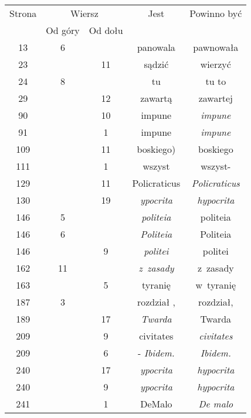\documentclass[a4paper,11pt]{article}
\numberwithin{equation}{section}
\begin{document}
\newpage



\begin{center}

  \begin{tabular}{|c|c|c|c|c|}
    \hline
    Strona & \multicolumn{2}{c|}{Wiersz} & Jest
                              & Powinno być \\ \cline{2-3}
    & Od góry & Od dołu & & \\
    \hline
    \hphantom{0}13 & \hphantom{0}6 & & panowala & pawnowała \\
    \hphantom{0}23 & & 11 & sądzić & wierzyć \\
    \hphantom{0}24 & \hphantom{0}8 & & tu & tu to \\
    \hphantom{0}29 & & 12 & zawartą & zawartej \\
    \hphantom{0}90 & & 10 & impune & \textit{impune} \\
    \hphantom{0}91 & & \hphantom{0}1 & impune & \textit{impune} \\
    109 & & 11 & boskiego) & boskiego \\
    111 & & \hphantom{0}1 & wszyst & wszyst- \\
    129 & & 11 & Policraticus & \textit{Policraticus} \\
    130 & & 19 & \textit{ypocrita} & \textit{hypocrita} \\
    146 & \hphantom{0}5 & & \textit{politeia} & politeia \\
    146 & \hphantom{0}6 & & \textit{Politeia}& Politeia \\
    146 & & \hphantom{0}9 & \textit{politei} & politei \\
    162 & 11 & & \textit{z~zasady} & z~zasady \\
    163 & & \hphantom{0}5 & tyranię & w~tyranię \\
    187 & \hphantom{0}3 & & rozdział , & rozdział, \\
    189 & & 17 & \textit{Twarda} & Twarda \\
    209 & & \hphantom{0}9 & civitates & \textit{civitates} \\
    209 & & \hphantom{0}6 & - \textit{Ibidem.} & \textit{Ibidem.} \\
    240 & & 17 & \textit{ypocrita} & \textit{hypocrita} \\
    240 & & \hphantom{0}9 & \textit{ypocrita} & \textit{hypocrita} \\
    241 & & \hphantom{0}1 & DeMalo & \textit{De malo} \\

\end{tabular}
\end{center}
\end{document}
